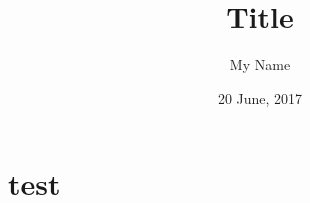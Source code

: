 \documentclass{beamer}
\title[Title]{Title}
\author{My Name\inst{1}}
\institute{
    \inst{1}
     Sample University testing and testing
}
\date{20 June, 2017}
\begin{document}
\frame{\titlepage}


\section{test}
\end{document}
